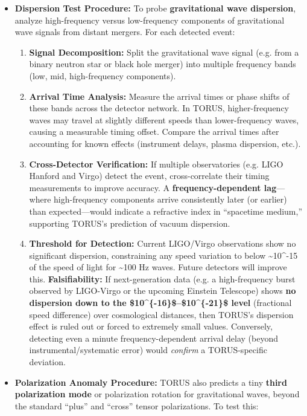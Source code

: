 \documentclass[
]{article}
\begin{document}
\begin{itemize}
\item
  \textbf{Dispersion Test Procedure:} To probe \textbf{gravitational
  wave dispersion}, analyze high-frequency versus low-frequency
  components of gravitational wave signals from distant mergers. For
  each detected event:

  \begin{enumerate}
  \def\labelenumi{\arabic{enumi}.}
  \item
    \textbf{Signal Decomposition:} Split the gravitational wave signal
    (e.g. from a binary neutron star or black hole merger) into multiple
    frequency bands (low, mid, high-frequency components).
  \item
    \textbf{Arrival Time Analysis:} Measure the arrival times or phase
    shifts of these bands across the detector network. In TORUS,
    higher-frequency waves may travel at slightly different speeds than
    lower-frequency waves, causing a measurable timing
    offset\hspace{0pt}. Compare the arrival times after accounting for
    known effects (instrument delays, plasma dispersion, etc.).
  \item
    \textbf{Cross-Detector Verification:} If multiple observatories
    (e.g. LIGO Hanford and Virgo) detect the event, cross-correlate
    their timing measurements to improve accuracy. A
    \textbf{frequency-dependent lag}---where high-frequency components
    arrive consistently later (or earlier) than expected---would
    indicate a refractive index in ``spacetime medium,'' supporting
    TORUS's prediction of vacuum dispersion\hspace{0pt}.
  \item
    \textbf{Threshold for Detection:} Current LIGO/Virgo observations
    show no significant dispersion, constraining any speed variation to
    below \textasciitilde10\^{}-15 of the speed of light for
    \textasciitilde100 Hz waves. Future detectors will improve this.
    \textbf{Falsifiability:} If next-generation data (e.g. a
    high-frequency burst observed by LIGO-Virgo or the upcoming Einstein
    Telescope) shows \textbf{no dispersion down to the
    \$10\^{}\{-16\}\$--\$10\^{}\{-21\}\$ level} (fractional speed
    difference) over cosmological distances, then TORUS's dispersion
    effect is ruled out or forced to extremely small values\hspace{0pt}.
    Conversely, detecting even a minute frequency-dependent arrival
    delay (beyond instrumental/systematic error) would \emph{confirm} a
    TORUS-specific deviation.
  \end{enumerate}
\item
  \textbf{Polarization Anomaly Procedure:} TORUS also predicts a tiny
  \textbf{third polarization mode} or polarization rotation for
  gravitational waves, beyond the standard ``plus'' and ``cross'' tensor
  polarizations\hspace{0pt}. To test this:


\end{itemize}
\end{document}
